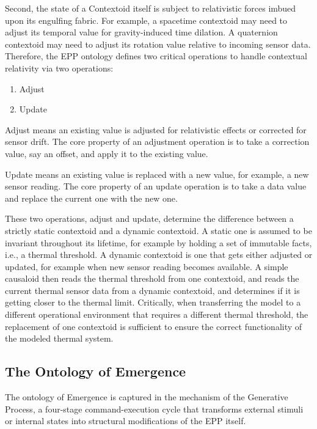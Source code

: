 Second, the state of a Contextoid itself is subject to relativistic forces imbued upon its engulfing fabric. For example, a spacetime contextoid may need to adjust its temporal value for  gravity-induced time dilation. A quaternion contextoid may need to adjust its rotation value relative to incoming sensor data. Therefore, the EPP ontology defines two critical operations to handle contextual relativity via two operations:

\begin{enumerate}
	\item Adjust
	\item Update
\end{enumerate}

Adjust means an existing value is adjusted for relativistic effects or corrected for sensor drift. The core property of an adjustment operation is to take a correction value, say an offset, and apply it to the existing value. 

Update means an existing value is replaced with a new value, for example, a new sensor reading. The core property of an update operation is to take a data value and replace the current one with the new one. 

These two operations, adjust and update, determine the difference between a strictly static contextoid and a dynamic contextoid. A static one is assumed to be invariant throughout its lifetime, for example by holding a set of immutable facts, i.e., a thermal threshold. A dynamic contextoid is one that gets either adjusted or updated, for example when new sensor reading becomes available. A simple causaloid then reads the thermal threshold from one contextoid, and reads the current thermal sensor data from a dynamic contextoid, and determines if it is getting closer to the thermal limit. Critically, when transferring the model to a different operational environment that requires a different thermal threshold, the replacement of one contextoid is sufficient to ensure the correct functionality of the modeled thermal system.  

\subsection{The Ontology of Emergence}
\label{sec:ontology_emergence}

The ontology of Emergence is captured in the mechanism of the Generative Process, a four-stage command-execution cycle that transforms external stimuli or internal states into structural modifications of the EPP itself. 

